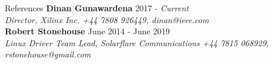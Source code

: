 \documentclass{format/resume} %
\begin{document}
\begin{rSection}{References}
  {\bf Dinan Gunawardena} \hfill {2017 -  \it Current} \\
  {\it Director, Xilinx Inc.} \hfill {\it +44 7808 926449, dinan@ieee.com} \\

  {\bf Robert Stonehouse} \hfill {June 2014 -  June 2019} \\
  {\it Linux Driver Team Lead, Solarflare Communications} \hfill {\it +44 7815 068929, rstonehouse@gmail.com} \\

\end{rSection}

\end{document}
